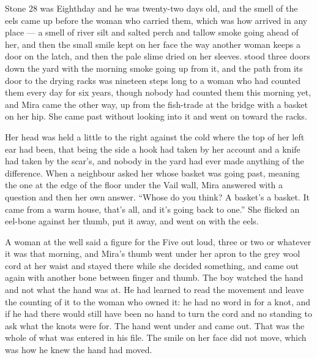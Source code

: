 \scenebreak


Stone 28 was Eighthday and he was twenty-two days old, and the smell of the eels came up  before the woman who carried them, which was how  arrived in any place --- a smell of river silt and salted perch and tallow smoke going ahead of her, and then the small smile kept on her face the way another woman keeps a door on the latch, and then the pale slime dried on her sleeves.  stood three doors down the yard with the morning smoke going up from it, and the path from its door to the drying racks was nineteen steps long to a woman who had counted them every day for six years, though nobody had counted them this morning yet, and Mira came the other way, up from the fish-trade at the bridge with a basket on her hip. She came past  without looking into it and went on toward the racks.

Her head was held a little to the right against the cold where the top of her left ear had been, that being the side a hook had taken by her account and a knife had taken by the scar's, and nobody in the yard had ever made anything of the difference. When a neighbour asked her whose basket was going past, meaning the one at the edge of the floor under the Vail wall, Mira answered with a question and then her own answer. “Whose do you think? A basket's a basket. It came from a warm house, that's all, and it's going back to one.” She flicked an eel-bone against her thumb, put it away, and went on with the eels.

A woman at the well said a figure for the Five out loud, three or two or whatever it was that morning, and Mira's thumb went under her apron to the grey wool cord at her waist and stayed there while she decided something, and came out again with another bone between finger and thumb. The boy watched the hand and not what the hand was at. He had learned to read the movement and leave the counting of it to the woman who owned it: he had no word in  for a knot, and if he had there would still have been no hand to turn the cord and no standing to ask what the knots were for. The hand went under and came out. That was the whole of what was entered in his file. The smile on her face did not move, which was how he knew the hand had moved.

